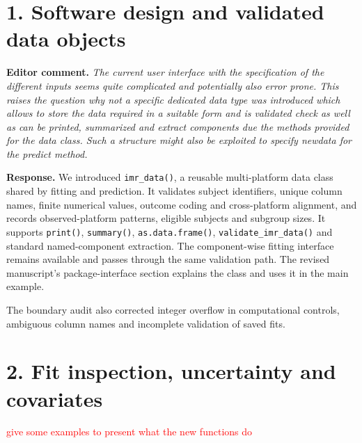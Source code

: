 \documentclass[11pt]{article}
\newcommand{\code}[1]{\texttt{#1}}
\newenvironment{editorcomment}
  {\par\smallskip\sloppy\noindent\textbf{Editor comment.}\itshape}
  {\par\smallskip\fussy}
\newenvironment{response}
  {\noindent\textbf{Response.}}
  {\par\smallskip}
\begin{document}
\section*{1. Software design and validated data objects}
\begin{editorcomment}
The current user interface with the specification of the different inputs seems
quite complicated and potentially also error prone. This raises the question why
not a specific dedicated data type was introduced which allows to store the data
required in a suitable form and is validated check as well as can be printed,
summarized and extract components due the methods provided for the data class.
Such a structure might also be exploited to specify newdata for the predict
method.
\end{editorcomment}
\begin{response}
We introduced \code{imr\_data()}, a reusable multi-platform data class shared
by fitting and prediction. It validates subject identifiers, unique column
names, finite numerical values, outcome coding and cross-platform alignment,
and records observed-platform patterns, eligible subjects and subgroup sizes.
It supports \code{print()}, \code{summary()}, \code{as.data.frame()},
\code{validate\_imr\_data()} and standard named-component extraction. The
component-wise fitting interface remains available and passes through the
same validation path. The revised manuscript's package-interface section
explains the class and uses it in the main example.

The boundary audit also corrected integer overflow in computational controls,
ambiguous column names and incomplete validation of saved fits.
\end{response}

\section*{2. Fit inspection, uncertainty and covariates}

\textcolor{red}{give some examples to present what the new functions do}
\end{document}
